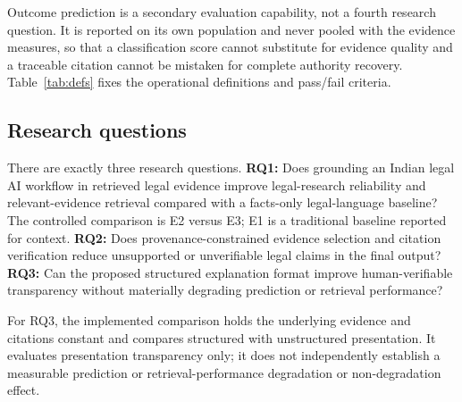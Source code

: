 \documentclass[conference]{IEEEtran}
\begin{document}
Outcome prediction is a secondary evaluation capability, not a fourth research
question. It is reported on its own
population and never pooled with the evidence measures, so that a classification
score cannot substitute for evidence quality and a traceable citation cannot be
mistaken for complete authority recovery. Table~\ref{tab:defs} fixes the
operational definitions and pass/fail criteria.

\subsection{Research questions}

There are exactly three research questions. \textbf{RQ1:} Does grounding an
Indian legal AI workflow in retrieved legal evidence improve legal-research
reliability and relevant-evidence retrieval compared with a facts-only
legal-language baseline? The controlled comparison is E2 versus E3; E1 is a
traditional baseline reported for context. \textbf{RQ2:} Does
provenance-constrained evidence selection and citation verification reduce
unsupported or unverifiable legal claims in the final output?
\textbf{RQ3:} Can the proposed structured explanation format improve
human-verifiable transparency without materially degrading prediction or
retrieval performance?

For RQ3, the implemented comparison holds the underlying evidence and citations
constant and compares structured with unstructured presentation. It evaluates
presentation transparency only; it does not independently establish a measurable
prediction or retrieval-performance degradation or non-degradation effect.
\end{document}
